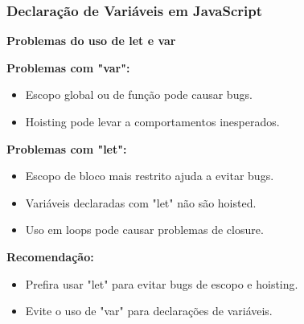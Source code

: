 \documentclass[13pt, xcolor={dvipsnames,svgnames}, portuguese]{beamer}
\begin{document}
\begin{frame}[fragile]
\frametitle{Declaração de Variáveis em JavaScript}

\textbf{Problemas do uso de let e var}

\textbf{Problemas com "var":}

\begin{itemize}
  \item Escopo global ou de função pode causar bugs.
  \item Hoisting pode levar a comportamentos inesperados.
\end{itemize}

\textbf{Problemas com "let":}

\begin{itemize}
  \item Escopo de bloco mais restrito ajuda a evitar bugs.
  \item Variáveis declaradas com "let" não são hoisted.
  \item Uso em loops pode causar problemas de closure.
\end{itemize}

\textbf{Recomendação:}

\begin{itemize}
  \item Prefira usar "let" para evitar bugs de escopo e hoisting.
  \item Evite o uso de "var" para declarações de variáveis.
\end{itemize}

\end{frame}
\end{document}
